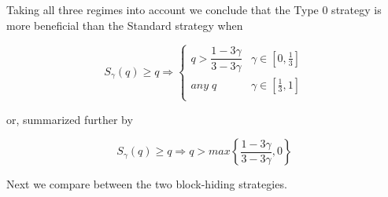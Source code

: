 \documentclass[letterpaper,12pt]{report}
\theoremstyle{plain}
\theoremstyle{definition}
\begin{document}
\noindent%
\begin{minipage}{\linewidth}
\label{fig:qbqc}
\end{minipage}
\linebreak


Taking all three regimes into account we conclude that the Type 0 strategy is more beneficial than the Standard strategy when

\begin{equation}\label{eq:0overhonest}
S_{\gamma}(q)\geq q \Longrightarrow
\begin{cases}
q>\dfrac{1-3\gamma}{3-3\gamma} & \gamma\in [0,\frac{1}{3}] \\ 
\mathit{any\;} q & \gamma\in [\frac{1}{3},1] \\ 
\end{cases}
\end{equation}

or, summarized further by 

\begin{equation}\label{eq:0overhonestsummary}
S_{\gamma}(q)\geq q \Longrightarrow
q>max\left\lbrace\dfrac{1-3\gamma}{3-3\gamma},0\right\rbrace
\end{equation}

Next we compare between the two block-hiding strategies.
\end{document}
